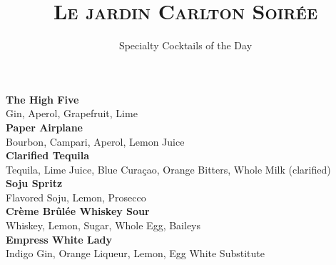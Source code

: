\documentclass[12pt]{article}
\author{Specialty Cocktails of the Day}
\begin{document}
\BgThispage

\title{\textsc{Le jardin Carlton Soirée}}
\date{}
\maketitle

\vspace{0.8cm}

\textsf{\textbf{The High Five}} \\
{\monofont Gin, Aperol, Grapefruit, Lime} \\[1em]

\textsf{\textbf{Paper Airplane}} \\
{\monofont Bourbon, Campari, Aperol, Lemon Juice} \\[1em]

\textsf{\textbf{Clarified Tequila}} \\
{\monofont Tequila, Lime Juice, Blue Curaçao, Orange Bitters, Whole Milk (clarified)} \\[1em]

\textsf{\textbf{Soju Spritz}} \\
{\monofont Flavored Soju, Lemon, Prosecco} \\[1em]


\textsf{\textbf{Crème Brûlée Whiskey Sour}} \\
{\monofont Whiskey, Lemon, Sugar, Whole Egg, Baileys} \\[1em]

\textsf{\textbf{Empress White Lady}} \\
{\monofont Indigo Gin, Orange Liqueur, Lemon, Egg White Substitute}
\end{document}
